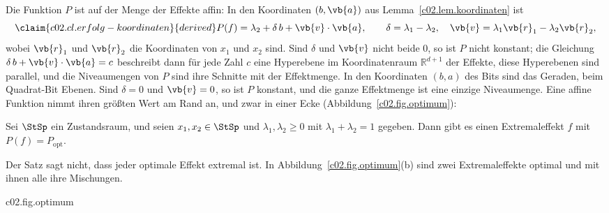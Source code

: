 Die Funktion $P$ ist auf der Menge der Effekte affin: In den Koordinaten $(b, \vb{a})$ aus
Lemma~\ref{c02.lem.koordinaten} ist
\begin{equation}\label{c02.eq.erfolg-koordinaten}\claim{c02.cl.erfolg-koordinaten}{derived}
  P(f) = \lambda_2 + \delta\, b + \vb{v}\cdot\vb{a},
  \qquad \delta = \lambda_1 - \lambda_2, \quad \vb{v} = \lambda_1 \vb{r}_1 - \lambda_2 \vb{r}_2 ,
\end{equation}
wobei $\vb{r}_1$ und $\vb{r}_2$ die Koordinaten von $x_1$ und $x_2$ sind. Sind $\delta$
und $\vb{v}$ nicht beide $0$, so ist $P$ nicht konstant; die Gleichung
$\delta\, b + \vb{v}\cdot\vb{a} = c$ beschreibt dann für jede Zahl $c$ eine Hyperebene im
Koordinatenraum $\mathbb{R}^{d+1}$ der Effekte, diese Hyperebenen sind parallel, und die
Niveaumengen von $P$ sind ihre Schnitte mit der Effektmenge. In den Koordinaten $(b, a)$
des Bits sind das Geraden, beim Quadrat-Bit Ebenen. Sind $\delta = 0$ und $\vb{v} = 0$, so
ist $P$ konstant, und die ganze Effektmenge ist eine einzige Niveaumenge. Eine affine
Funktion nimmt ihren größten Wert am Rand an, und zwar in einer Ecke
(Abbildung~\ref{c02.fig.optimum}):

\begin{theorem}\label{c02.thm.extremal}
  Sei $\StSp$ ein Zustandsraum, und seien $x_1, x_2 \in \StSp$ und
  $\lambda_1, \lambda_2 \geq 0$ mit $\lambda_1 + \lambda_2 = 1$ gegeben. Dann gibt es einen
  Extremaleffekt $f$ mit $P(f) = P_{\mathrm{opt}}$.
\end{theorem}

Der Satz sagt nicht, dass jeder optimale Effekt extremal ist. In
Abbildung~\ref{c02.fig.optimum}(b) sind zwei Extremaleffekte optimal und mit ihnen alle
ihre Mischungen.

\begin{tpcfigure}{c02.fig.optimum}
  \caption{Die Erfolgswahrscheinlichkeit $P$ als Funktion auf der Effektmenge; die dünnen
    Linien sind Niveaulinien von $P$. (a) Klassisches Bit mit $x_1 = (\tfrac34, \tfrac14)$,
    $x_2 = (\tfrac14, \tfrac34)$ und $\lambda_1 = \lambda_2 = \tfrac12$: Hier ist
    $P = \tfrac12 + \tfrac14(q_0 - q_1)$, und der größte Wert $\tfrac34$ wird nur in der
    Ecke $(1,0)$ angenommen. (b) Quadrat-Bit mit $x_1 = (1,1)$, $x_2 = (-1,-1)$ und
    $\lambda_1 = \lambda_2 = \tfrac12$: Hier ist $P = \tfrac12 + a_x + a_y$ unabhängig von
    $b$; gezeichnet ist der Schnitt $b = \tfrac12$ durch die Doppelpyramide. Der größte
    Wert $1$ wird auf der ganzen Kante zwischen $f_x^{+}$ und $f_y^{+}$ angenommen. Optimale
    Extremaleffekte sind eingekreist.}
\end{tpcfigure}

